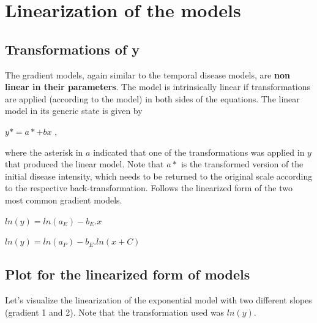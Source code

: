 \documentclass[
  letterpaper,
]{book}
\begin{document}
\hypertarget{linearization-of-the-models}{%
\section{Linearization of the
models}\label{linearization-of-the-models}}

\hypertarget{transformations-of-y}{%
\subsection{Transformations of y}\label{transformations-of-y}}

The gradient models, again similar to the temporal disease models, are
\textbf{non linear in their parameters}. The model is intrinsically
linear if transformations are applied (according to the model) in both
sides of the equations. The linear model in its generic state is given
by

\(y* = a* + bx\) ,

where the asterisk in \(a\) indicated that one of the transformations
was applied in \(y\) that produced the linear model. Note that \(a*\) is
the transformed version of the initial disease intensity, which needs to
be returned to the original scale according to the respective
back-transformation. Follows the linearized form of the two most common
gradient models.

\(ln(y) = ln(a_{E}) - b_{E}. x\)

\(ln(y) = ln(a_{P}) - b_{E}. ln(x+C)\)

\hypertarget{plot-for-the-linearized-form-of-models}{%
\subsection{Plot for the linearized form of
models}\label{plot-for-the-linearized-form-of-models}}

Let's visualize the linearization of the exponential model with two
different slopes (gradient 1 and 2). Note that the transformation used
was \(ln(y)\).
\end{document}
